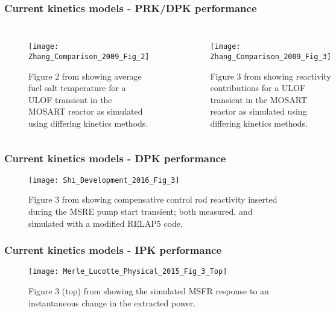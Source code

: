 \documentclass{beamer}
\begin{document}
\begin{frame}
\frametitle{Current kinetics models - PRK/DPK performance}

    \begin{columns}


    \begin{figure}
        \centering
        \texttt{[image: Zhang\_Comparison\_2009\_Fig\_2]}
        \caption{Figure 2 from \cite{zhang_comparison_2009} showing average fuel salt temperature for a
   ULOF transient in the MOSART reactor as simulated using differing kinetics methods.}
        \label{fig:zhang_comparison_temp}
    \end{figure}


    \begin{figure}
        \centering
        \texttt{[image: Zhang\_Comparison\_2009\_Fig\_3]}
        \caption{Figure 3 from \cite{zhang_comparison_2009} showing reactivity contributions for a
   ULOF transient in the MOSART reactor as simulated using differing kinetics methods.}
        \label{fig:zhang_comparison_reac}
    \end{figure}

    \end{columns}

\end{frame}

\begin{frame}
\frametitle{Current kinetics models - DPK performance}

    \begin{figure}
        \centering
        \texttt{[image: Shi\_Development\_2016\_Fig\_3]}
        \caption{Figure 3 from \cite{shi_development_2016} showing 
    compensative control rod reactivity inserted during the MSRE pump start
   transient; both measured, and simulated with a modified RELAP5 code.}
        \label{fig:shi_development_relap}
    \end{figure}

\end{frame}

\begin{frame}
\frametitle{Current kinetics models - IPK performance}

    \begin{figure}
        \centering
        \texttt{[image: Merle\_Lucotte\_Physical\_2015\_Fig\_3\_Top]}
        \caption{Figure 3 (top) from \cite{merle-lucotte_physical_2015} showing the simulated
   MSFR response to an instantaneous change in the extracted power.}
        \label{fig:merle_physical_reac}
    \end{figure}

\end{frame}
\end{document}
